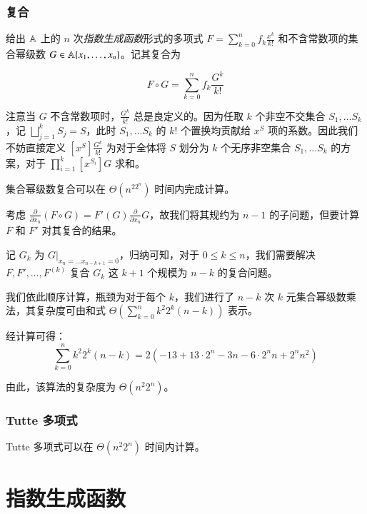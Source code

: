\subsubsection{复合}

\begin{definition} [集合幂级数复合]
给出 $\mathbb A$ 上的 $n$ 次\emph{指数生成函数}形式的多项式 $F = \sum_{k=0}^n f_k \frac{x^k}{k!}$ 和不含常数项的集合幂级数 $G \in \mathbb A\{x_1, \dots, x_n\}$。记其复合为

$$
F\circ G = \sum_{k=0}^n f_k\frac{G^k}{k!}
$$

注意当 $G$ 不含常数项时，$\frac{G^k}{k!}$ 总是良定义的。因为任取 $k$ 个非空不交集合 $S_1,\dots S_k$，记 $\bigsqcup_{j=1}^k S_j = S$，此时 $S_1,\dots S_k$ 的 $k!$ 个置换均贡献给 $x^S$ 项的系数。因此我们不妨直接定义 $[x^S]\frac{G^k}{k!}$ 为对于全体将 $S$ 划分为 $k$ 个无序非空集合 $S_1,\dots S_k$ 的方案，对于 $\prod_{i=1}^k [x^{S_i}]G$ 求和。
\end{definition}

\begin{theorem}
集合幂级数复合可以在 $\Theta(n^22^n)$ 时间内完成计算。
\end{theorem}

考虑 $\frac{\partial}{\partial x_n} (F \circ G) = F'(G)\frac{\partial}{\partial x_n} G$，故我们将其规约为 $n-1$ 的子问题，但要计算 $F$ 和 $F'$ 对其复合的结果。

记 $G_k$ 为 $\left. G \right |_{x_n = \dots x_{n-k+1}=0}$，归纳可知，对于 $0\le k\le n$，我们需要解决 $F, F', \dots, F^{(k)}$ 复合 $G_k$ 这 $k+1$ 个规模为 $n-k$ 的复合问题。

我们依此顺序计算，瓶颈为对于每个 $k$，我们进行了 $n-k$ 次 $k$ 元集合幂级数乘法，其复杂度可由和式 $\Theta \left(\sum_{k=0}^n k^2 2^k (n-k)\right)$ 表示。

经计算可得：
$$
\sum_{k=0}^n k^2 2^k (n-k) = 2(-13 + 13\cdot 2^n - 3n - 6\cdot 2^n n+ 2^n n^2)
$$

由此，该算法的复杂度为 $\Theta(n^2 2^n)$。

\subsubsection{Tutte 多项式}

\begin{theorem}
Tutte 多项式可以在 $\Theta(n^2 2^n)$ 时间内计算。
\end{theorem}


\section{指数生成函数}

